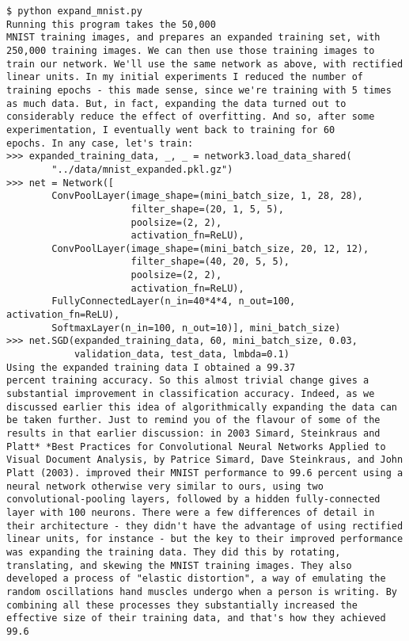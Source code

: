 \begin{lstlisting}
$ python expand_mnist.py
Running this program takes the 50,000
MNIST training images, and prepares an expanded training set, with 250,000 training images. We can then use those training images to train our network. We'll use the same network as above, with rectified linear units. In my initial experiments I reduced the number of training epochs - this made sense, since we're training with 5 times as much data. But, in fact, expanding the data turned out to considerably reduce the effect of overfitting. And so, after some experimentation, I eventually went back to training for 60
epochs. In any case, let's train:
>>> expanded_training_data, _, _ = network3.load_data_shared(
        "../data/mnist_expanded.pkl.gz")
>>> net = Network([
        ConvPoolLayer(image_shape=(mini_batch_size, 1, 28, 28), 
                      filter_shape=(20, 1, 5, 5), 
                      poolsize=(2, 2), 
                      activation_fn=ReLU),
        ConvPoolLayer(image_shape=(mini_batch_size, 20, 12, 12), 
                      filter_shape=(40, 20, 5, 5), 
                      poolsize=(2, 2), 
                      activation_fn=ReLU),
        FullyConnectedLayer(n_in=40*4*4, n_out=100, activation_fn=ReLU),
        SoftmaxLayer(n_in=100, n_out=10)], mini_batch_size)
>>> net.SGD(expanded_training_data, 60, mini_batch_size, 0.03, 
            validation_data, test_data, lmbda=0.1)
Using the expanded training data I obtained a 99.37
percent training accuracy. So this almost trivial change gives a substantial improvement in classification accuracy. Indeed, as we discussed earlier this idea of algorithmically expanding the data can be taken further. Just to remind you of the flavour of some of the results in that earlier discussion: in 2003 Simard, Steinkraus and Platt* *Best Practices for Convolutional Neural Networks Applied to Visual Document Analysis, by Patrice Simard, Dave Steinkraus, and John Platt (2003). improved their MNIST performance to 99.6 percent using a neural network otherwise very similar to ours, using two convolutional-pooling layers, followed by a hidden fully-connected layer with 100 neurons. There were a few differences of detail in their architecture - they didn't have the advantage of using rectified linear units, for instance - but the key to their improved performance was expanding the training data. They did this by rotating, translating, and skewing the MNIST training images. They also developed a process of "elastic distortion", a way of emulating the random oscillations hand muscles undergo when a person is writing. By combining all these processes they substantially increased the effective size of their training data, and that's how they achieved 99.6

\end{lstlisting}
